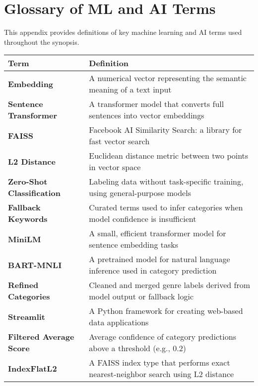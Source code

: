 \chapter{Glossary of ML and AI Terms}
\label{appendix:glossary}

This appendix provides definitions of key machine learning and AI terms used throughout the synopsis.
{\small
\begin{longtable}{p{3.5cm}p{9.5cm}}
\toprule
\textbf{Term} & \textbf{Definition} \\
\midrule
\textbf{Embedding} & A numerical vector representing the semantic meaning of a text input \\
\textbf{Sentence Transformer} & A transformer model that converts full sentences into vector embeddings \\
\textbf{FAISS} & Facebook AI Similarity Search: a library for fast vector search \\
\textbf{L2 Distance} & Euclidean distance metric between two points in vector space \\
\textbf{Zero-Shot Classification} & Labeling data without task-specific training, using general-purpose models \\
\textbf{Fallback Keywords} & Curated terms used to infer categories when model confidence is insufficient \\
\textbf{MiniLM} & A small, efficient transformer model for sentence embedding tasks \\
\textbf{BART-MNLI} & A pretrained model for natural language inference used in category prediction \\
\textbf{Refined Categories} & Cleaned and merged genre labels derived from model output or fallback logic \\
\textbf{Streamlit} & A Python framework for creating web-based data applications \\
\textbf{Filtered Average Score} & Average confidence of category predictions above a threshold (e.g., 0.2) \\
\textbf{IndexFlatL2} & A FAISS index type that performs exact nearest-neighbor search using L2 distance \\
\bottomrule
\end{longtable}
}
